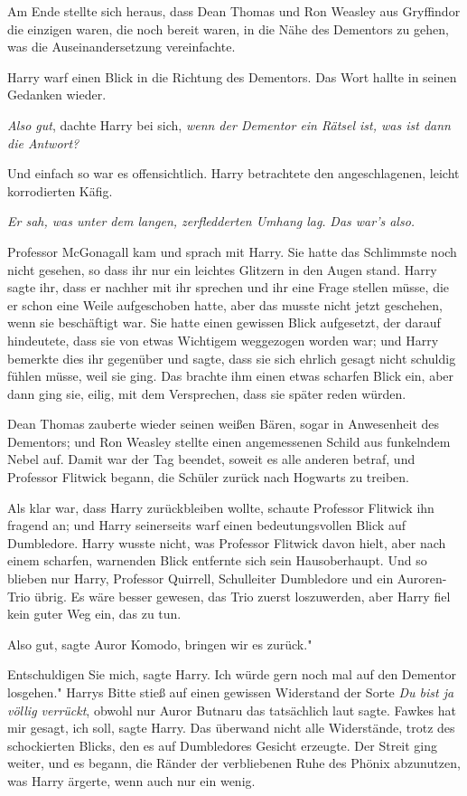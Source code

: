 Am Ende stellte sich heraus, dass Dean Thomas und Ron Weasley aus Gryffindor die
einzigen waren, die noch bereit waren, in die Nähe des Dementors zu gehen, was
die Auseinandersetzung vereinfachte.

Harry warf einen Blick in die Richtung des Dementors. Das Wort hallte in seinen
Gedanken wieder.

\emph{Also gut}, dachte Harry bei sich, \emph{wenn der Dementor ein Rätsel ist,
was ist dann die Antwort?}

Und einfach so war es offensichtlich. Harry betrachtete den angeschlagenen,
leicht korrodierten Käfig.

\emph{Er sah, was unter dem langen, zerfledderten Umhang lag.} \emph{Das war's
also.}

Professor McGonagall kam und sprach mit Harry. Sie hatte das Schlimmste noch
nicht gesehen, so dass ihr nur ein leichtes Glitzern in den Augen stand. Harry
sagte ihr, dass er nachher mit ihr sprechen und ihr eine Frage stellen müsse,
die er schon eine Weile aufgeschoben hatte, aber das musste nicht jetzt
geschehen, wenn sie beschäftigt war. Sie hatte einen gewissen Blick aufgesetzt,
der darauf hindeutete, dass sie von etwas Wichtigem weggezogen worden war; und
Harry bemerkte dies ihr gegenüber und sagte, dass sie sich ehrlich gesagt nicht
schuldig fühlen müsse, weil sie ging. Das brachte ihm einen etwas scharfen Blick
ein, aber dann ging sie, eilig, mit dem Versprechen, dass sie später reden
würden.

Dean Thomas zauberte wieder seinen weißen Bären, sogar in Anwesenheit des
Dementors; und Ron Weasley stellte einen angemessenen Schild aus funkelndem
Nebel auf. Damit war der Tag beendet, soweit es alle anderen betraf, und
Professor Flitwick begann, die Schüler zurück nach Hogwarts zu treiben.

Als klar war, dass Harry zurückbleiben wollte, schaute Professor Flitwick ihn
fragend an; und Harry seinerseits warf einen bedeutungsvollen Blick auf
Dumbledore. Harry wusste nicht, was Professor Flitwick davon hielt, aber nach
einem scharfen, warnenden Blick entfernte sich sein Hausoberhaupt. Und so
blieben nur Harry, Professor Quirrell, Schulleiter Dumbledore und ein
Auroren-Trio übrig. Es wäre besser gewesen, das Trio zuerst loszuwerden, aber
Harry fiel kein guter Weg ein, das zu tun.

\glqq Also gut\grqq{}, sagte Auror Komodo, \glqq bringen wir es zurück."

\glqq Entschuldigen Sie mich\grqq{}, sagte Harry. \glqq Ich würde gern noch mal
auf den Dementor losgehen." Harrys Bitte stieß auf einen gewissen Widerstand der
Sorte \glqq \emph{Du bist ja völlig verrückt}\grqq{}, obwohl nur Auror Butnaru
das tatsächlich laut sagte. \glqq Fawkes hat mir gesagt, ich soll\grqq{}, sagte
Harry. Das überwand nicht alle Widerstände, trotz des schockierten Blicks, den
es auf Dumbledores Gesicht erzeugte. Der Streit ging weiter, und es begann, die
Ränder der verbliebenen Ruhe des Phönix abzunutzen, was Harry ärgerte, wenn auch
nur ein wenig.

